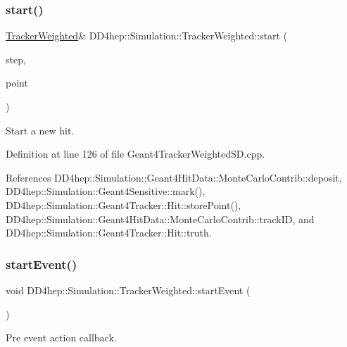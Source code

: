 \subsubsection{\texorpdfstring{start()}{start()}}
{\footnotesize\ttfamily \hyperlink{struct_d_d4hep_1_1_simulation_1_1_tracker_weighted}{Tracker\+Weighted}\& D\+D4hep\+::\+Simulation\+::\+Tracker\+Weighted\+::start (\begin{DoxyParamCaption}\item[{const G4\+Step $\ast$}]{step,  }\item[{const G4\+Step\+Point $\ast$}]{point }\end{DoxyParamCaption})\hspace{0.3cm}{\ttfamily [inline]}}



Start a new hit. 



Definition at line 126 of file Geant4\+Tracker\+Weighted\+S\+D.\+cpp.



References D\+D4hep\+::\+Simulation\+::\+Geant4\+Hit\+Data\+::\+Monte\+Carlo\+Contrib\+::deposit, D\+D4hep\+::\+Simulation\+::\+Geant4\+Sensitive\+::mark(), D\+D4hep\+::\+Simulation\+::\+Geant4\+Tracker\+::\+Hit\+::store\+Point(), D\+D4hep\+::\+Simulation\+::\+Geant4\+Hit\+Data\+::\+Monte\+Carlo\+Contrib\+::track\+ID, and D\+D4hep\+::\+Simulation\+::\+Geant4\+Tracker\+::\+Hit\+::truth.

\hypertarget{struct_d_d4hep_1_1_simulation_1_1_tracker_weighted_a15fd630fa0e1ca7e3c0516952ad5f976}{}\label{struct_d_d4hep_1_1_simulation_1_1_tracker_weighted_a15fd630fa0e1ca7e3c0516952ad5f976} 
\subsubsection{\texorpdfstring{start\+Event()}{startEvent()}}
{\footnotesize\ttfamily void D\+D4hep\+::\+Simulation\+::\+Tracker\+Weighted\+::start\+Event (\begin{DoxyParamCaption}{ }\end{DoxyParamCaption})\hspace{0.3cm}{\ttfamily [inline]}}



Pre event action callback. 



